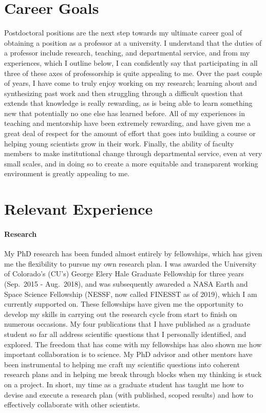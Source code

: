 \documentclass[aps, pre, onecolumn, nofootinbib, notitlepage, groupedaddress, amsfonts, amssymb, amsmath]{revtex4-1}
\begin{document}
\section*{Career Goals}
\vspace{-12pt}
Postdoctoral positions are the next step towards my ultimate career goal of obtaining a position as a professor at a university.
I understand that the duties of a professor include research, teaching, and departmental service, and from my experiences, which I outline below, I can confidently say that participating in all three of these axes of professorship is quite appealing to me.
Over the past couple of years, I have come to truly enjoy working on my research; learning about and synthesizing past work and then struggling through a difficult question that extends that knowledge is really rewarding, as is being able to learn something new that potentially no one else has learned before.
All of my experiences in teaching and mentorship have been extremely rewarding, and have given me a great deal of respect for the amount of effort that goes into building a course or helping young scientists grow in their work.
Finally, the ability of faculty members to make institutional change through departmental service, even at very small scales, and in doing so to create a more equitable and transparent working environment is greatly appealing to me.

\section*{Relevant Experience}
\vspace{-12pt}
\paragraph*{Research}
My PhD research has been funded almost entirely by fellowships, which has given me the flexibility to pursue my own research plan.
I was awarded the University of Colorado's (CU's) George Elery Hale Graduate Fellowship for three years (Sep.~2015 - Aug.~2018), and was subsequently awareded a NASA Earth and Space Science Fellowship (NESSF, now called FINESST as of 2019), which I am currently supported on.
These fellowships have given me the opportunity to develop my skills in carrying out the research cycle from start to finish on numerous occasions.
My four publications that I have published as a graduate student so far all address scientific questions that I personally identified, and explored.
The freedom that has come with my fellowships has also shown me how important collaboration is to science.
My PhD advisor and other mentors have been instrumental to helping me craft my scientific questions into coherent research plans and in helping me break through blocks when my thinking is stuck on a project.
In short, my time as a graduate student has taught me how to devise and execute a research plan (with published, scoped results) and how to effectively collaborate with other scientists.
\end{document}
